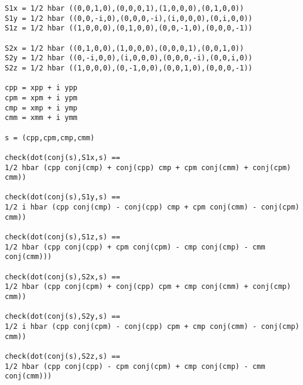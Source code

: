 \newpage
{}

{\footnotesize\begin{verbatim}
S1x = 1/2 hbar ((0,0,1,0),(0,0,0,1),(1,0,0,0),(0,1,0,0))
S1y = 1/2 hbar ((0,0,-i,0),(0,0,0,-i),(i,0,0,0),(0,i,0,0))
S1z = 1/2 hbar ((1,0,0,0),(0,1,0,0),(0,0,-1,0),(0,0,0,-1))

S2x = 1/2 hbar ((0,1,0,0),(1,0,0,0),(0,0,0,1),(0,0,1,0))
S2y = 1/2 hbar ((0,-i,0,0),(i,0,0,0),(0,0,0,-i),(0,0,i,0))
S2z = 1/2 hbar ((1,0,0,0),(0,-1,0,0),(0,0,1,0),(0,0,0,-1))

cpp = xpp + i ypp
cpm = xpm + i ypm
cmp = xmp + i ymp
cmm = xmm + i ymm

s = (cpp,cpm,cmp,cmm)

check(dot(conj(s),S1x,s) ==
1/2 hbar (cpp conj(cmp) + conj(cpp) cmp + cpm conj(cmm) + conj(cpm) cmm))

check(dot(conj(s),S1y,s) ==
1/2 i hbar (cpp conj(cmp) - conj(cpp) cmp + cpm conj(cmm) - conj(cpm) cmm))

check(dot(conj(s),S1z,s) ==
1/2 hbar (cpp conj(cpp) + cpm conj(cpm) - cmp conj(cmp) - cmm conj(cmm)))

check(dot(conj(s),S2x,s) ==
1/2 hbar (cpp conj(cpm) + conj(cpp) cpm + cmp conj(cmm) + conj(cmp) cmm))

check(dot(conj(s),S2y,s) ==
1/2 i hbar (cpp conj(cpm) - conj(cpp) cpm + cmp conj(cmm) - conj(cmp) cmm))

check(dot(conj(s),S2z,s) ==
1/2 hbar (cpp conj(cpp) - cpm conj(cpm) + cmp conj(cmp) - cmm conj(cmm)))
\end{verbatim}}


